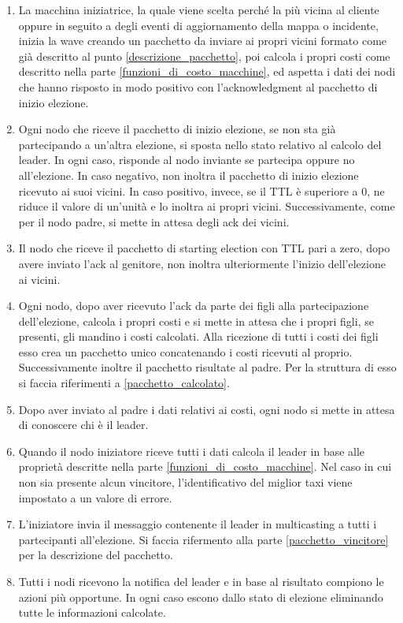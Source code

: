 \begin{enumerate}
	\item La macchina iniziatrice, la quale viene scelta perché la più vicina al cliente oppure in seguito a degli eventi di aggiornamento della mappa o incidente, inizia la wave creando un pacchetto da inviare ai propri vicini formato come già descritto al punto \ref{descrizione_pacchetto}, poi calcola i propri costi come descritto nella parte \ref{funzioni_di_costo_macchine}, ed aspetta i dati dei nodi che hanno risposto in modo positivo con l'acknowledgment al pacchetto di inizio elezione.
	\item Ogni nodo che riceve il pacchetto di inizio elezione, se non sta già partecipando a un'altra elezione, si sposta nello stato relativo al calcolo del leader. In ogni caso, risponde al nodo inviante se partecipa oppure no all'elezione. In caso negativo, non inoltra il pacchetto di inizio elezione ricevuto ai suoi vicini. In caso positivo, invece, se il TTL è superiore a 0, ne riduce il valore di un'unità e lo inoltra ai propri vicini. Successivamente, come per il nodo padre, si mette in attesa degli ack dei vicini.
	\item Il nodo che riceve il pacchetto di starting election con TTL pari a zero, dopo avere inviato l'ack al genitore, non inoltra ulteriormente l'inizio dell'elezione ai vicini.
	\item Ogni nodo, dopo aver ricevuto l'ack da parte dei figli alla partecipazione dell'elezione, calcola i propri costi e si mette in attesa che i propri figli, se presenti, gli mandino i costi calcolati. Alla ricezione di tutti i costi dei figli esso crea un pacchetto unico concatenando i costi ricevuti al proprio. Successivamente inoltre il pacchetto risultate al padre. Per la struttura di esso si faccia riferimenti a \ref{pacchetto_calcolato}.
	\item Dopo aver inviato al padre i dati relativi ai costi, ogni nodo si mette in attesa di conoscere chi è il leader.
	\item Quando il nodo iniziatore riceve tutti i dati calcola il leader in base alle proprietà descritte nella parte \ref{funzioni_di_costo_macchine}. Nel caso in cui non sia presente alcun vincitore, l'identificativo del miglior taxi viene impostato a un valore di errore.
	\item L'iniziatore invia il messaggio contenente il leader in multicasting a tutti i partecipanti all'elezione. Si faccia rifermento alla parte \ref{pacchetto_vincitore} per la descrizione del pacchetto.
	\item Tutti i nodi ricevono la notifica del leader e in base al risultato compiono le azioni più opportune. In ogni caso escono dallo stato di elezione eliminando tutte le informazioni calcolate.

\end{enumerate}

